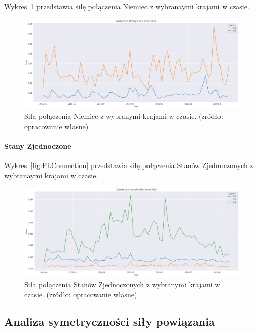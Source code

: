 \documentclass[11pt]{report}
\begin{document}
    Wykres~\ref{fig:DEUConnection} przedstawia siłę połączenia Niemiec z wybranaymi krajami w czasie.

    \begin{figure}[ht]
        \centering
        \includegraphics[width=1 \textwidth]{fig/DEU/DEUConnection.png}
        \caption{Siła połączenia Niemiec z wybranymi krajami w czasie. (zródło: opracowanie własne)}
        \label{fig:DEUConnection}
    \end{figure}

    \paragraph{Stany Zjednoczone}

    Wykres~\ref{fig:PLConnection} przedstawia siłę połączenia Stanów Zjednoczonych z wybranaymi krajami w czasie.

    \begin{figure}[ht]
        \centering
        \includegraphics[width=1 \textwidth]{fig/USA/USAConnection.png}
        \caption{Siła połączenia Stanów Zjednoczonych z wybranymi krajami w czasie. (zródło: opracowanie własne)}
        \label{fig:USAConnection}
    \end{figure}

    \subsection{Analiza symetryczności siły powiązania}
\end{document}
